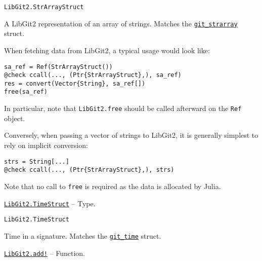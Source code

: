 \begin{adjustwidth}{2em}{0pt}


\begin{verbatim}
LibGit2.StrArrayStruct
\end{verbatim}

A LibGit2 representation of an array of strings. Matches the \href{https://libgit2.org/libgit2/\#HEAD/type/git\_strarray}{\texttt{git\_strarray}} struct.

When fetching data from LibGit2, a typical usage would look like:


\begin{verbatim}
sa_ref = Ref(StrArrayStruct())
@check ccall(..., (Ptr{StrArrayStruct},), sa_ref)
res = convert(Vector{String}, sa_ref[])
free(sa_ref)
\end{verbatim}

In particular, note that \texttt{LibGit2.free} should be called afterward on the \texttt{Ref} object.

Conversely, when passing a vector of strings to LibGit2, it is generally simplest to rely on implicit conversion:


\begin{verbatim}
strs = String[...]
@check ccall(..., (Ptr{StrArrayStruct},), strs)
\end{verbatim}

Note that no call to \texttt{free} is required as the data is allocated by Julia.



\end{adjustwidth}
\hypertarget{11932909532186040994}{} 
\hyperlink{11932909532186040994}{\texttt{LibGit2.TimeStruct}}  -- {Type.}

\begin{adjustwidth}{2em}{0pt}


\begin{verbatim}
LibGit2.TimeStruct
\end{verbatim}

Time in a signature. Matches the \href{https://libgit2.org/libgit2/\#HEAD/type/git\_time}{\texttt{git\_time}} struct.



\end{adjustwidth}
\hypertarget{16270901697937111000}{} 
\hyperlink{16270901697937111000}{\texttt{LibGit2.add!}}  -- {Function.}

